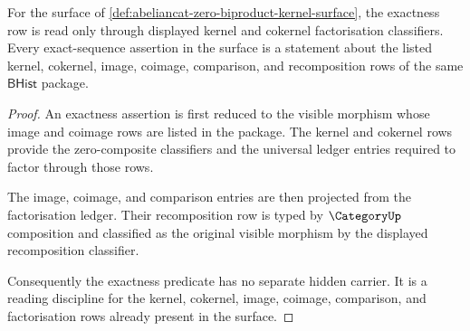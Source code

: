 \begin{theorem}
\label{thm:abeliancat-exact-sequence-obligation}
For the surface of
\autoref{def:abeliancat-zero-biproduct-kernel-surface}, the exactness row is
read only through displayed kernel and cokernel factorisation classifiers.
Every exact-sequence assertion in the surface is a statement about the listed
kernel, cokernel, image, coimage, comparison, and recomposition rows of the
same $\mathsf{BHist}$ package.
\end{theorem}
\begin{proof}
An exactness assertion is first reduced to the visible morphism whose image and
coimage rows are listed in the package. The kernel and cokernel rows provide
the zero-composite classifiers and the universal ledger entries required to
factor through those rows.

The image, coimage, and comparison entries are then projected from the
factorisation ledger. Their recomposition row is typed by $\CategoryUp$
composition and classified as the original visible morphism by the displayed
recomposition classifier.

Consequently the exactness predicate has no separate hidden carrier. It is a
reading discipline for the kernel, cokernel, image, coimage, comparison, and
factorisation rows already present in the surface.
\end{proof}

